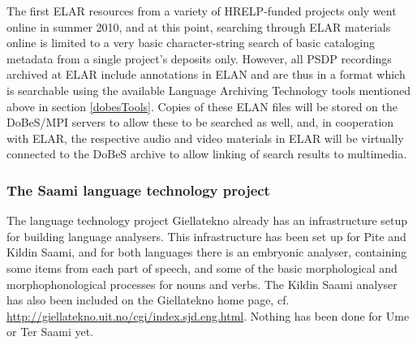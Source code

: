 \documentclass[a4paper,12pt]{article}
\begin{document}
The first ELAR resources from a variety of HRELP-funded projects only went online in summer 2010, and at this point, searching through ELAR materials online is limited to a very basic character-string search of basic cataloging metadata from a single project's deposits only. However, all PSDP recordings archived at ELAR include annotations in ELAN and are thus in a format which is searchable using the available Language Archiving Technology tools mentioned above in section \ref{dobesTools}. Copies of these ELAN files will be stored on the DoBeS/MPI servers to allow these to be searched as well, and, in cooperation with ELAR, the respective audio and video materials in ELAR will be virtually connected to the DoBeS archive to allow linking of search results to multimedia. %
%

\subsubsection{The Saami language technology project}%

The language technology project Giellatekno already has an infrastructure setup for building language analysers. This infrastructure has been set up for Pite and Kildin Saami, and for both languages there is an embryonic analyser, containing some items from each part of speech, and some of the basic morphological and morphophonological processes for nouns and verbs. The Kildin Saami analyser has also been included on the Giellatekno home page, cf. \url{http://giellatekno.uit.no/cgi/index.sjd.eng.html}.  Nothing has been done for Ume or Ter Saami yet.
\end{document}
